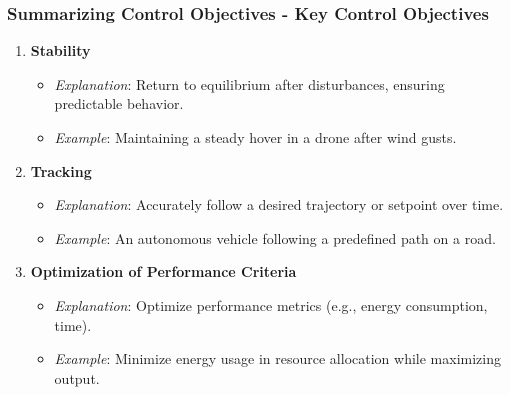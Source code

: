 \documentclass[aspectratio=169]{beamer}
\begin{document}
\begin{frame}[fragile]
    \frametitle{Summarizing Control Objectives - Key Control Objectives}
    \begin{enumerate}
        \item \textbf{Stability}
            \begin{itemize}
                \item \textit{Explanation}: Return to equilibrium after disturbances, ensuring predictable behavior.
                \item \textit{Example}: Maintaining a steady hover in a drone after wind gusts.
            \end{itemize}
        
        \item \textbf{Tracking}
            \begin{itemize}
                \item \textit{Explanation}: Accurately follow a desired trajectory or setpoint over time.
                \item \textit{Example}: An autonomous vehicle following a predefined path on a road.
            \end{itemize}
        
        \item \textbf{Optimization of Performance Criteria}
            \begin{itemize}
                \item \textit{Explanation}: Optimize performance metrics (e.g., energy consumption, time).
                \item \textit{Example}: Minimize energy usage in resource allocation while maximizing output.
            \end{itemize}
    \end{enumerate}
\end{frame}
\end{document}
